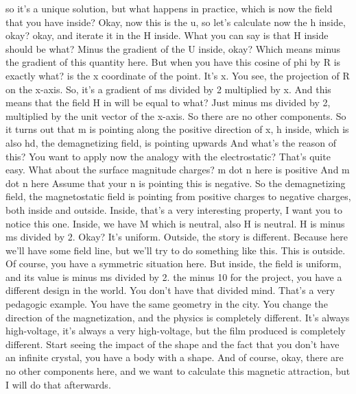 so it's a unique solution, but what happens in practice, which is now the field that you have inside? Okay, now this is the u, so let's calculate now the h inside, okay? okay, and iterate it in the H inside. What you can say is that H inside should be what? Minus the gradient of the U inside, okay? Which means minus the gradient of this quantity here. But when you have this cosine of phi by R is exactly what? is the x coordinate of the point. It's x. You see, the projection of R on the x-axis. So, it's a gradient of ms divided by 2 multiplied by x. And this means that the field H in will be equal to what? Just minus ms divided by 2, multiplied by the unit vector of the x-axis. So there are no other components. So it turns out that m is pointing along the positive direction of x, h inside, which is also hd, the demagnetizing field, is pointing upwards And what's the reason of this? You want to apply now the analogy with the electrostatic? That's quite easy. What about the surface magnitude charges? m dot n here is positive And m dot n here Assume that your n is pointing this is negative. So the demagnetizing field, the magnetostatic field is pointing from positive charges to negative charges, both inside and outside. Inside, that's a very interesting property, I want you to notice this one. Inside, we have M which is neutral, also H is neutral. H is minus ms divided by 2. Okay? It's uniform. Outside, the story is different. Because here we'll have some field line, but we'll try to do something like this. This is outside. Of course, you have a symmetric situation here. But inside, the field is uniform, and its value is minus ms divided by 2. the minus 10 for the project, you have a different design in the world. You don't have that divided mind. That's a very pedagogic example. You have the same geometry in the city. You change the direction of the magnetization, and the physics is completely different. It's always high-voltage, it's always a very high-voltage, but the film produced is completely different. Start seeing the impact of the shape and the fact that you don't have an infinite crystal, you have a body with a shape. And of course, okay, there are no other components here, and we want to calculate this magnetic attraction, but I will do that afterwards.
